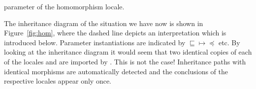\begin{isabellebody}
\begin{isamarkuptext}
  parameter of the homomorphism locale.%
\end{isamarkuptext}%
\isamarkuptrue%
%
\begin{isamarkuptext}%
The inheritance diagram of the situation we have now is shown
  in Figure~\ref{fig:hom}, where the dashed line depicts an
  interpretation which is introduced below.  Parameter instantiations
  are indicated by $\sqsubseteq \mapsto \preceq$ etc.  By looking at
  the inheritance diagram it would seem
  that two identical copies of each of the locales  and  are imported by .  This is not the case!  Inheritance paths with
  identical morphisms are automatically detected and
  the conclusions of the respective locales appear only once.


\end{isamarkuptext}
\end{isabellebody}
